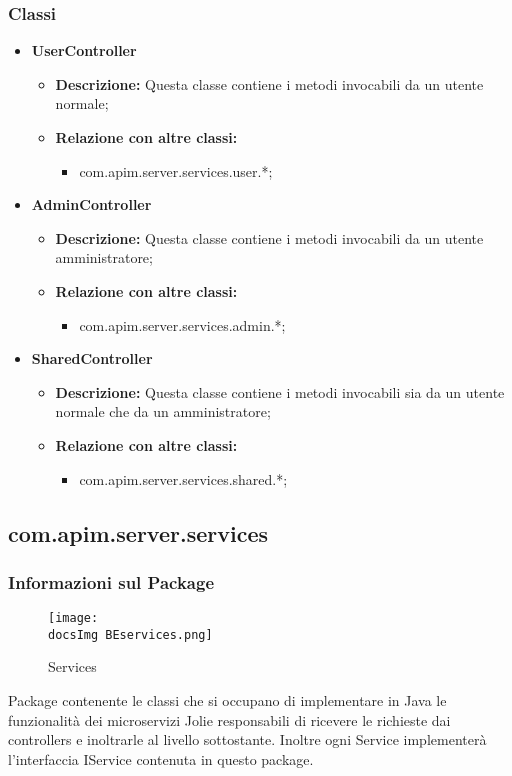 {{        \subsubsection{Classi}
        \begin{itemize} \itemsep1pt
        \item \textbf{UserController}
        \begin{itemize}
        \item \textbf{Descrizione:} Questa classe contiene i metodi invocabili da un utente normale;
        \item \textbf{Relazione con altre classi:}
        \begin{itemize}
        \item com.apim.server.services.user.*;
        \end{itemize}
        \end{itemize}
        \item \textbf{AdminController}
        \begin{itemize}
        \item \textbf{Descrizione:} Questa classe contiene i metodi invocabili da un utente amministratore;
        \item \textbf{Relazione con altre classi:}
        \begin{itemize}
        \item com.apim.server.services.admin.*;
        \end{itemize}
        \end{itemize}
        \item \textbf{SharedController}
        \begin{itemize}
        \item \textbf{Descrizione:} Questa classe contiene i metodi invocabili sia da un utente normale che da un amministratore;
        \item \textbf{Relazione con altre classi:}
        \begin{itemize}
        \item com.apim.server.services.shared.*;
        \end{itemize}
        \end{itemize}
        \end{itemize}
  }
  \subsection{com.apim.server.services}{
    \subsubsection{Informazioni sul Package}
     \begin{figure}[H]
       \centering
       \texttt{[image: \\docsImg BEservices.png]}
       \caption{Services}
       \label{Services}
     \end{figure}
     Package contenente le classi che si occupano di implementare in Java le funzionalità dei microservizi Jolie responsabili di ricevere le richieste dai controllers e inoltrarle al livello sottostante. Inoltre ogni Service implementerà l'interfaccia IService contenuta in questo package.
}}
